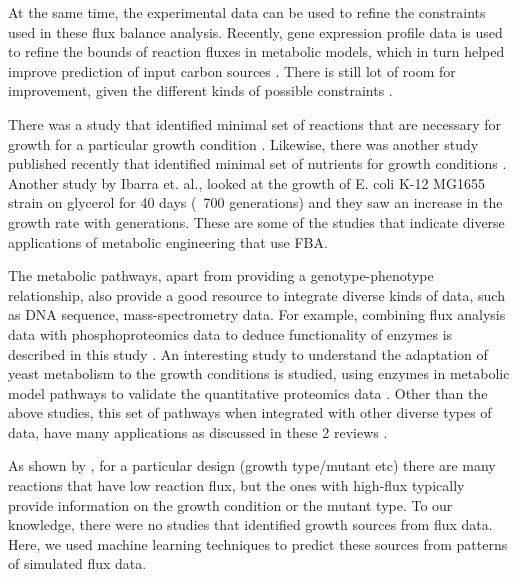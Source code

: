 \documentclass[12pt]{article}
\begin{document}
\bigskip
\noindent
At the same time, the experimental data can be used to refine the constraints used in these flux balance analysis. Recently, gene expression profile data is used to refine the bounds of reaction fluxes in metabolic models, which in turn helped improve prediction of input carbon sources \cite{Brandesetal2012}. There is still lot of room for improvement, given the different kinds of possible constraints \cite{Priceetal2004}.

\bigskip
\noindent
There was a study that identified minimal set of reactions that are necessary for growth for a particular growth condition \cite{Burgardetal2001}. Likewise, there was another study published recently that identified minimal set of nutrients for growth conditions \cite{Ekeretal2013}. Another study by Ibarra et. al., \cite{Ibarraetal2002} looked at the growth of E. coli K-12 MG1655 strain on glycerol for 40 days (~700 generations) and they saw an increase in the growth rate with generations. These are some of the studies that indicate diverse applications of metabolic engineering that use FBA.
 
\bigskip
\noindent
The metabolic pathways, apart from providing a genotype-phenotype relationship, also provide a good resource to integrate diverse kinds of data, such as DNA sequence, mass-spectrometry data. For example, combining flux analysis data with phosphoproteomics data to deduce functionality of enzymes is described in this study \cite{Oliveiraetal2012}. An interesting study to understand the adaptation of yeast metabolism to the growth conditions is studied, using enzymes in metabolic model pathways to validate the quantitative proteomics data \cite{Costenobleetal2011}. Other than the above studies, this set of pathways when integrated with other diverse types of data, have many applications as discussed in these 2 reviews \cite{Hydukeetal2013,Oberhardtetal2009}.

\bigskip
\noindent
As shown by \cite{Almaasetal2004}, for a particular design (growth type/mutant etc) there are many reactions that have low reaction flux, but the ones with high-flux typically provide information on the growth condition or the mutant type. To our knowledge, there were no studies that identified growth sources from flux data. Here, we used machine learning techniques to predict these sources from patterns of simulated flux data.
\end{document}
